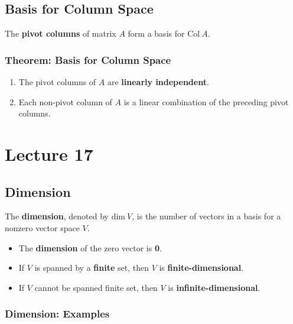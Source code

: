 \documentclass[12pt, letterpaper]{article}
\begin{document}
\subsection*{Basis for Column Space}

The \textbf{pivot columns} of matrix $ A $ form a basis for $
\textrm{Col} \: A $.

\subsubsection*{Theorem: Basis for Column Space}

\begin{enumerate}
  \item The pivot columns of $ A $ are \textbf{linearly independent}.
  \item Each non-pivot column of $ A $ is a linear combination of the
    preceding pivot columns.
\end{enumerate}

\section*{Lecture 17}

\subsection*{Dimension}

The \textbf{dimension}, denoted by $ \textrm{dim} \: V $, is the
number of vectors in a basis for a nonzero vector space $ V $.

\begin{itemize}
  \item The \textbf{dimension} of the zero vector is \textbf{0}.
  \item If $ V $ is spanned by a \textbf{finite} set, then $ V $ is
    \textbf{finite-dimensional}.
  \item If $ V $ cannot be spanned finite set, then $ V $ is
    \textbf{infinite-dimensional}.
\end{itemize}

\subsubsection*{Dimension: Examples}
\end{document}
